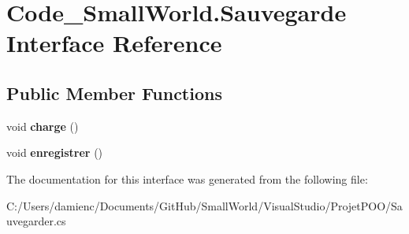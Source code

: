 \hypertarget{interface_code___small_world_1_1_sauvegarde}{\section{Code\-\_\-\-Small\-World.\-Sauvegarde Interface Reference}
\label{interface_code___small_world_1_1_sauvegarde}
}
\subsection*{Public Member Functions}
\begin{DoxyCompactItemize}
\item 
\hypertarget{interface_code___small_world_1_1_sauvegarde_aa42959c5c48617c7ec92761073dd3c9c}{void {\bfseries charge} ()}\label{interface_code___small_world_1_1_sauvegarde_aa42959c5c48617c7ec92761073dd3c9c}

\item 
\hypertarget{interface_code___small_world_1_1_sauvegarde_aae150a11c73d425342b1592eaf71c9ff}{void {\bfseries enregistrer} ()}\label{interface_code___small_world_1_1_sauvegarde_aae150a11c73d425342b1592eaf71c9ff}

\end{DoxyCompactItemize}


The documentation for this interface was generated from the following file\-:\begin{DoxyCompactItemize}
\item 
C\-:/\-Users/damienc/\-Documents/\-Git\-Hub/\-Small\-World/\-Visual\-Studio/\-Projet\-P\-O\-O/Sauvegarder.\-cs\end{DoxyCompactItemize}
